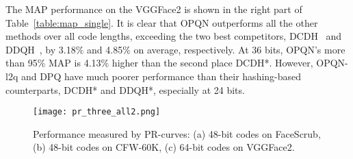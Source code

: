 \documentclass{elsarticle}
\begin{document}
The MAP performance on the VGGFace2 is shown in the right part of Table~\ref{table:map_single}. It is clear that OPQN outperforms all the other methods over all code lengths, exceeding the two best competitors, DCDH~\cite{zhang2021deep} and DDQH~\cite{tang2018discriminative}, by 3.18$\%$ and 4.85$\%$ on average, respectively. At 36 bits, OPQN's more than 95$\%$ MAP is 4.13$\%$ higher than the second place DCDH*. However, OPQN-l2q and DPQ have much poorer performance than their hashing-based counterparts, DCDH* and DDQH*, especially at 24 bits. 

\begin{figure}[htbp]
	\centering
	\texttt{[image: pr\_three\_all2.png]}
	\caption{Performance measured by PR-curves: (a) 48-bit codes on FaceScrub, (b) 48-bit codes on CFW-60K, (c) 64-bit codes on VGGFace2.}
	\label{pr_three}
\end{figure}
\end{document}
